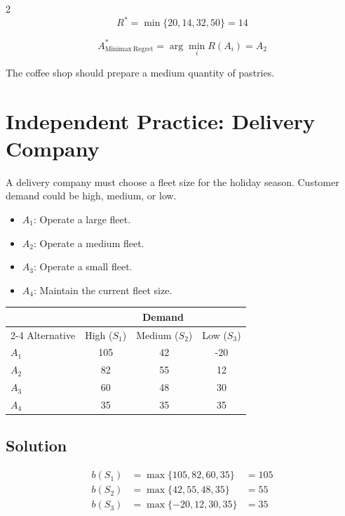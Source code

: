 \begin{multicols}{2}
		\[
		R^*
		=
		\min\{20,14,32,50\}
		=
		14
		\]
		
		\[
		A^*_{\mathrm{Minimax\ Regret}}
		=
		\arg\min_i R(A_i)
		=
		A_2
		\]
		
		The coffee shop should prepare a medium quantity of pastries.
		
		\section{Independent Practice: Delivery Company}
		
		A delivery company must choose a fleet size for the holiday season.
		Customer demand could be high, medium, or low.
		\begin{itemize}
			\item $A_1$: Operate a large fleet.
			\item $A_2$: Operate a medium fleet.
			\item $A_3$: Operate a small fleet.
			\item $A_4$: Maintain the current fleet size.
		\end{itemize}
		
		\begin{center}
			\renewcommand{\arraystretch}{1.3}
			\small
			\begin{tabular}{lccc}
				\toprule
				& \multicolumn{3}{c}{Demand} \\
				\cmidrule(lr){2-4}
				Alternative & High ($S_1$) & Medium ($S_2$) & Low ($S_3$) \\
				\midrule
				$A_1$ & 105 & 42 & -20 \\
				$A_2$ & 82 & 55 & 12 \\
				$A_3$ & 60 & 48 & 30 \\
				$A_4$ & 35 & 35 & 35 \\
				\bottomrule
			\end{tabular}
		\end{center}
		
		\subsection*{Solution}
		
		\[
		\begin{array}{lll}
			b(S_1) &= \max\{105,82,60,35\} &= 105 \\[3pt]
			b(S_2) &= \max\{42,55,48,35\} &= 55 \\[3pt]
			b(S_3) &= \max\{-20,12,30,35\} &= 35
		\end{array}
		\]
		

\end{multicols}
